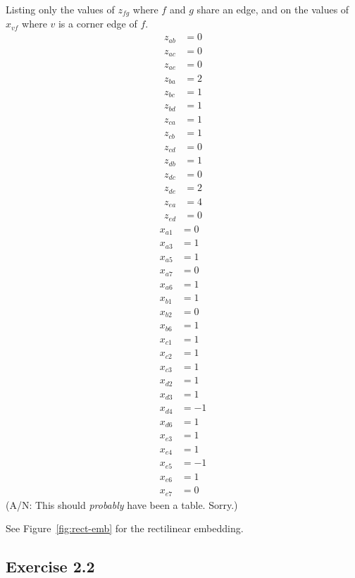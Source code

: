 Listing only the values of $z_{fg}$ where $f$ and $g$ share an edge,
and on the values of $x_{vf}$ where $v$ is a corner edge of $f$.
\begingroup
\newcommand\zfg[3]{z_{ #1 #2} &= #3}
\newcommand\xvf[3]{x_{ #1 #2} &= #3}
\begin{align*}
  \zfg a b 0 \\
  \zfg a c 0 \\
  \zfg a e 0 \\
  \zfg b a 2 \\
  \zfg b c 1 \\
  \zfg b d 1 \\
  \zfg c a 1 \\
  \zfg c b 1 \\
  \zfg c d 0 \\
  \zfg d b 1 \\
  \zfg d c 0 \\
  \zfg d e 2 \\
  \zfg e a 4 \\
  \zfg e d 0
\end{align*}
\begin{align*}
  \xvf a 1 0 \\
  \xvf a 3 1 \\
  \xvf a 5 1 \\
  \xvf a 7 0 \\
  \xvf a 6 1 \\
  \xvf b 1 1 \\
  \xvf b 2 0 \\
  \xvf b 6 1 \\
  \xvf c 1 1 \\
  \xvf c 2 1 \\
  \xvf c 3 1 \\
  \xvf d 2 1 \\
  \xvf d 3 1 \\
  \xvf d 4 {-1} \\
  \xvf d 6 1 \\
  \xvf e 3 1 \\
  \xvf e 4 1 \\
  \xvf e 5 {-1} \\
  \xvf e 6 1 \\
  \xvf e 7 0
\end{align*}
\endgroup
(A/N: This should \emph{probably} have been a table. Sorry.)

See Figure~\ref{fig:rect-emb} for the rectilinear embedding.

\subsection{Exercise 2.2}


